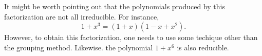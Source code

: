 \documentclass[12pt]{article}
\begin{document}
It might be worth pointing out that the polynomials produced by this factorization are not all irreducible.  For instance,
\[ 1 + x^3 = (1 + x) (1 - x + x^2). \]
However, to obtain this factorization, one needs to use some techique other than the grouping method.  Likewise. the polynomial $1 + x^6$ is also reducible.
\end{document}
